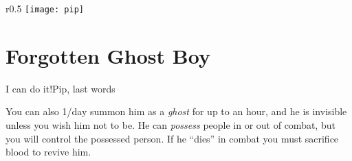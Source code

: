

\begin{wrapfigure}{r}{0.5\columnsep}
  \texttt{[image: pip]}
\end{wrapfigure}

\section{Forgotten Ghost Boy}

\flavorquote
{I can do it!}{Pip, last words}
\endminipage


You can also 1/day summon him as a \textit{ghost} for up to an hour, and he is invisible unless you wish him not to be. He can \textit{possess} people in or out of combat, but you will control the possessed person. If he “dies” in combat you must sacrifice blood to revive him.




